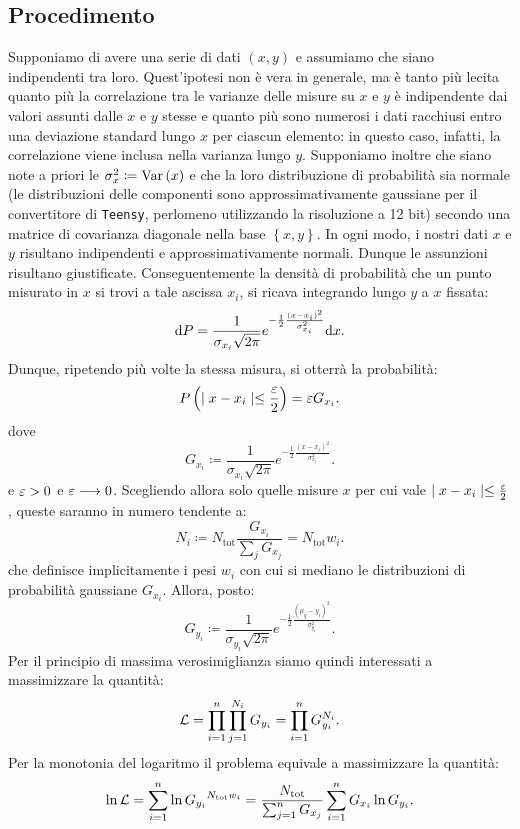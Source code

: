 \documentclass{article}[a4paper, oneside, 11pt]
\begin{document}
\subsection{Procedimento}
Supponiamo di avere una serie di dati $(x, y)$ e assumiamo che siano
indipendenti tra loro. Quest'ipotesi non è vera in generale, ma
è tanto più lecita quanto più la correlazione tra le varianze delle misure su
$x$ e $y$ è indipendente dai valori assunti dalle $x$ e $y$ stesse e quanto più
sono numerosi i dati racchiusi entro una deviazione standard lungo $x$ per 
ciascun elemento: in questo caso, infatti, la correlazione viene inclusa nella
varianza lungo $y$.
Supponiamo inoltre che siano note a priori le $\sigma_x ^2 \coloneqq \text{Var}\left(x\right)$
e che la loro distribuzione di probabilità sia normale (le distribuzioni
delle componenti sono approssimativamente gaussiane per il convertitore
di \verb+Teensy+, perlomeno utilizzando la risoluzione a 12 bit) secondo una 
matrice
di covarianza diagonale nella base $\left\{x, y\right\}$.
In ogni modo, i nostri dati $x$ e $y$ risultano indipendenti e
approssimativamente normali. Dunque le assunzioni risultano giustificate. 
Conseguentemente la densità di probabilità che un punto misurato in $x$ si trovi
a tale ascissa $x_i$, si ricava integrando lungo $y$ a $x$ fissata:
\[
	\mathrm{d} P = \frac{1}{\sigma_{x_i} \sqrt{2\pi}}
	e^{-\frac{1}{2}{\frac{(x - x_i)^2}{\sigma_{x_i}^2}}} \mathrm{d} x
.\] 
Dunque, ripetendo più volte la stessa misura, si otterrà la probabilità:
\[
	P\left(\mid x - x_i \mid \leq \frac{\varepsilon}{2} \right) = \varepsilon G_{x_i} 
.\]
dove \[
	G_{x_i} \coloneqq \frac{1}{\sigma_{x_i} \sqrt{2\pi}}
	e^{-\frac{1}{2}{\frac{(x - x_i)^2}{\sigma_{x_i}^2}}}
.\] 
e $\varepsilon > 0$ e $\varepsilon \longrightarrow 0$. Scegliendo allora solo quelle misure $x$ per
cui vale $\mid x - x_i \mid \leq \frac{\varepsilon}{2}$, queste saranno in numero
tendente a:
\[
	N_i \coloneqq N_{\text{tot}} \frac{G_{x_i}}{\sum_j G_{x_j}} =
		N_{\text{tot}} w_i
.\] 
che definisce implicitamente i pesi $w_i$ con cui si mediano le distribuzioni
di probabilità gaussiane $G_{x_i}$.
Allora, posto:
\[
	G_{y_i} \coloneqq \frac{1}{\sigma_{y_i} \sqrt{2\pi}}
	e^{-\frac{1}{2}{\frac{(\mu_y - y_i)^2}{\sigma_{y_i}^2}}}
.\] 
Per il principio di massima verosimiglianza siamo quindi interessati a
massimizzare la quantità:
\[
	\mathcal L = \prod_{i=1}^{n} \prod_{j=1}^{N_i} G_{y_i} = 
	\prod_{i=1}^{n} G_{y_i}^{N_i}
.\] 
Per la monotonia del logaritmo il problema equivale a massimizzare la quantità:
\[
	\ln{\mathcal L} = \sum_{i=1}^{n}\ln{G_{y_i}}^{N_{\text{tot}}w_i} = 
	\frac{N_{\text{tot}}} {\sum_{j=1}^{n} G_{x_j}} 
	\sum_{i=1}^{n} G_{x_i} \ln{G_{y_i}}
.\] 
\end{document}
